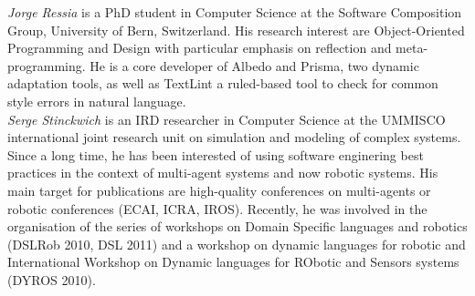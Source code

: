 \documentclass[runningheads]{llncs}
\begin{document}


\noindent \emph{Jorge Ressia} is a PhD student in Computer Science at the Software
Composition Group, University of Bern, Switzerland. His research
interest are Object-Oriented Programming and Design with particular
emphasis on reflection and meta-programming. He is a core developer of
Albedo and Prisma, two dynamic adaptation  tools, as well as TextLint
a ruled-based tool to check for common style errors in natural
language.\\


\noindent \emph{Serge Stinckwich} is an IRD researcher in Computer Science at the UMMISCO international joint research unit on simulation and modeling of complex systems. Since a long time, he has been interested of using software enginering best practices in the context of multi-agent systems and now robotic systems. His main target for publications are high-quality conferences on multi-agents or robotic conferences (ECAI, ICRA, IROS). Recently, he was involved in the organisation of the series of workshops on Domain Specific languages and robotics (DSLRob 2010, DSL 2011) and a workshop on dynamic languages for robotic and International Workshop on Dynamic languages for RObotic and Sensors systems (DYROS 2010).\\
\end{document}
